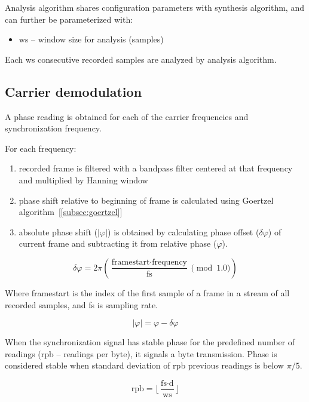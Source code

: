 \documentclass[english,bachelor,a4paper,oneside]{ppfcmthesis}
\begin{document}
Analysis algorithm shares configuration parameters with synthesis algorithm, and can further be parameterized with:

\begin{itemize}
\item ws -- window size for analysis (samples)
\end{itemize}

Each ws consecutive recorded samples are analyzed by analysis algorithm.

\subsection{Carrier demodulation}

A phase reading is obtained for each of the carrier frequencies and synchronization frequency.

For each frequency:
\begin{enumerate}
\item recorded frame is filtered with a bandpass filter centered at that frequency and multiplied by Hanning window %
\item phase shift relative to beginning of frame is calculated using Goertzel algorithm~[\ref{subsec:goertzel}]
\item absolute phase shift ($|\varphi|$) is obtained by calculating phase offset ($\delta\varphi$) of current frame and subtracting it from relative phase ($\varphi$).
\end{enumerate}

\begin{equation}
\delta\varphi = 2\pi(\frac{\textrm{framestart} \cdot \textrm{frequency}}{\textrm{fs}} \pmod{1.0})
\end{equation}

Where framestart is the index of the first sample of a frame in a stream of all recorded samples, and fs is sampling rate.

\begin{equation}
|\varphi| = \varphi - \delta\varphi
\end{equation}

When the synchronization signal has stable phase for the predefined number of readings (rpb -- readings per byte), it signals a byte transmission.
Phase is considered stable when standard deviation of rpb previous readings is below $\pi/5$.

\begin{equation}
\textrm{rpb} = \lfloor\frac{\textrm{fs} \cdot \textrm{d}}{\textrm{ws}}\rfloor
\end{equation}
\end{document}
